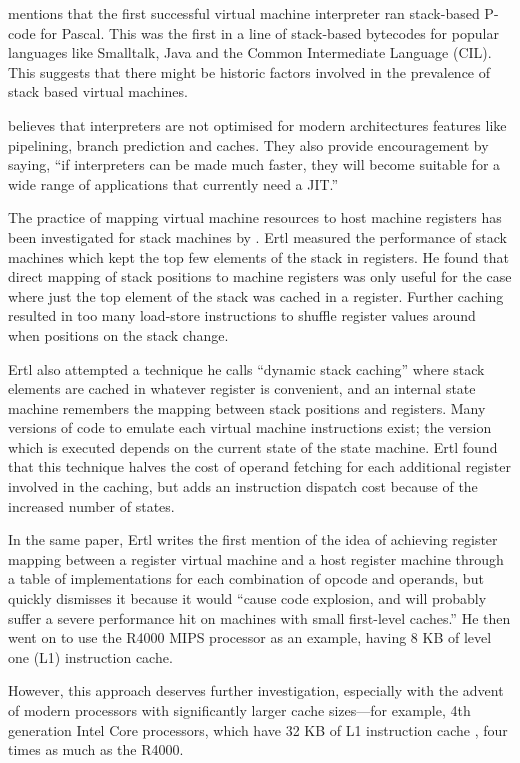 		\cite{caseregistervm} mentions that the first successful virtual machine interpreter ran stack-based P-code for Pascal. This was the first in a line of stack-based bytecodes for popular languages like Smalltalk, Java and the Common Intermediate Language (CIL). This suggests that there might be historic factors involved in the prevalence of stack based virtual machines.
		
		\cite{fastjava} believes that interpreters are not optimised for modern architectures features like pipelining, branch prediction and caches. They also provide encouragement by saying, ``if interpreters can be made much faster, they will become suitable for a wide range of applications that currently need a JIT.''
		
		
		The practice of mapping virtual machine resources to host machine registers has been investigated for stack machines by \cite{stackcaching}. Ertl measured the performance of stack machines which kept the top few elements of the stack in registers. He found that direct mapping of stack positions to machine registers was only useful for the case where just the top element of the stack was cached in a register. Further caching resulted in too many load-store instructions to shuffle register values around when positions on the stack change.
		
		Ertl also attempted a technique he calls ``dynamic stack caching'' where stack elements are cached in whatever register is convenient, and an internal state machine remembers the mapping between stack positions and registers. Many versions of code to emulate each virtual machine instructions exist; the version which is executed depends on the current state of the state machine. Ertl found that this technique halves the cost of operand fetching for each additional register involved in the caching, but adds an instruction dispatch cost because of the increased number of states.
		
		In the same paper, Ertl writes the first mention of the idea of achieving register mapping between a register virtual machine and a host register machine through a table of implementations for each combination of opcode and operands, but quickly dismisses it because it would ``cause code explosion, and will probably suffer a severe performance hit on machines with small first-level caches.'' He then went on to use the R4000 MIPS processor as an example, having 8 KB of level one (L1) instruction cache.
	
		However, this approach deserves further investigation, especially with the advent of modern processors with significantly larger cache sizes---for example, 4th generation Intel Core processors, which have 32 KB of L1 instruction cache \citep{haswellarch}, four times as much as the R4000.
	

